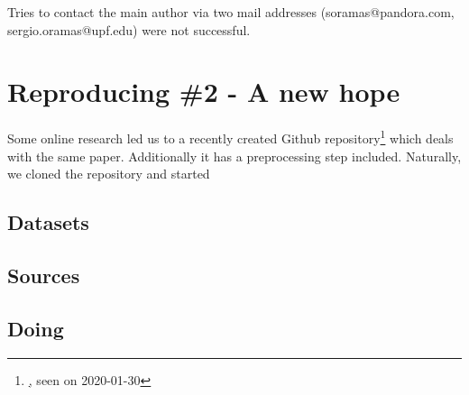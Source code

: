 \documentclass[sigconf,nonacm]{acmart}
\begin{document}
Tries to contact the main author via two mail addresses (soramas@pandora.com, sergio.oramas@upf.edu) were not successful.


\section{Reproducing \#2 - A new hope} 

Some online research led us to a recently created Github repository\footnote{\href{https://github.com/nikuya3/acousticbrainz-mediaeval-baseline}, seen on 2020-01-30} which deals with the same paper. Additionally it has a preprocessing step included. Naturally, we cloned the repository and started \textit{}


\subsection{Datasets}

\subsection{Sources}

\subsection{Doing}






\end{document}

